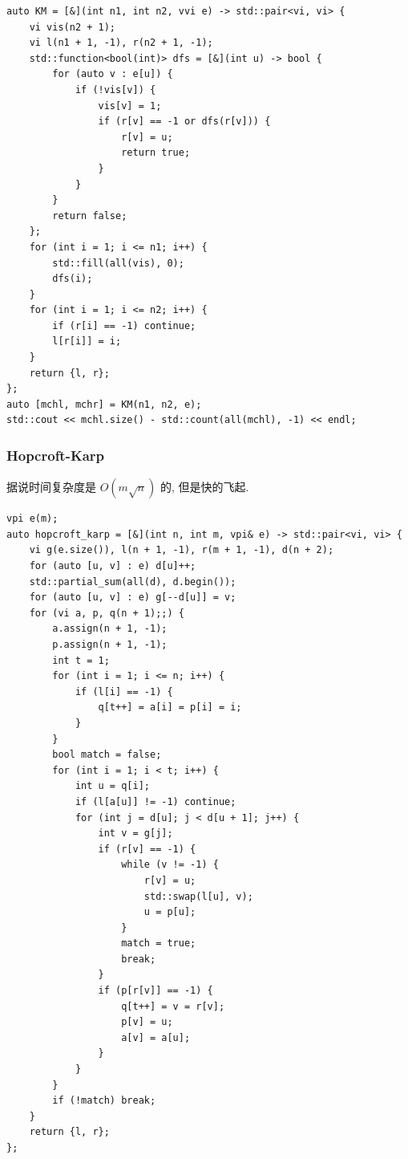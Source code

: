 \documentclass[UTF8, a4paper, titlepage, twoside]{ctexart}
\begin{document}
\begin{lstlisting}[style=cpp]
auto KM = [&](int n1, int n2, vvi e) -> std::pair<vi, vi> {
    vi vis(n2 + 1);
    vi l(n1 + 1, -1), r(n2 + 1, -1);
    std::function<bool(int)> dfs = [&](int u) -> bool {
        for (auto v : e[u]) {
            if (!vis[v]) {
                vis[v] = 1;
                if (r[v] == -1 or dfs(r[v])) {
                    r[v] = u;
                    return true;
                }
            }
        }
        return false;
    };
    for (int i = 1; i <= n1; i++) {
        std::fill(all(vis), 0);
        dfs(i);
    }
    for (int i = 1; i <= n2; i++) {
        if (r[i] == -1) continue;
        l[r[i]] = i;
    }
    return {l, r};
};
auto [mchl, mchr] = KM(n1, n2, e);
std::cout << mchl.size() - std::count(all(mchl), -1) << endl;
\end{lstlisting}

\subsubsection*{ Hopcroft-Karp }
据说时间复杂度是 \(O(m \sqrt{n})\) 的, 但是快的飞起.

\begin{lstlisting}[style=cpp]
vpi e(m);
auto hopcroft_karp = [&](int n, int m, vpi& e) -> std::pair<vi, vi> {
    vi g(e.size()), l(n + 1, -1), r(m + 1, -1), d(n + 2);
    for (auto [u, v] : e) d[u]++;
    std::partial_sum(all(d), d.begin());
    for (auto [u, v] : e) g[--d[u]] = v;
    for (vi a, p, q(n + 1);;) {
        a.assign(n + 1, -1);
        p.assign(n + 1, -1);
        int t = 1;
        for (int i = 1; i <= n; i++) {
            if (l[i] == -1) {
                q[t++] = a[i] = p[i] = i;
            }
        }
        bool match = false;
        for (int i = 1; i < t; i++) {
            int u = q[i];
            if (l[a[u]] != -1) continue;
            for (int j = d[u]; j < d[u + 1]; j++) {
                int v = g[j];
                if (r[v] == -1) {
                    while (v != -1) {
                        r[v] = u;
                        std::swap(l[u], v);
                        u = p[u];
                    }
                    match = true;
                    break;
                }
                if (p[r[v]] == -1) {
                    q[t++] = v = r[v];
                    p[v] = u;
                    a[v] = a[u];
                }
            }
        }
        if (!match) break;
    }
    return {l, r};
};
\end{lstlisting}
\end{document}
